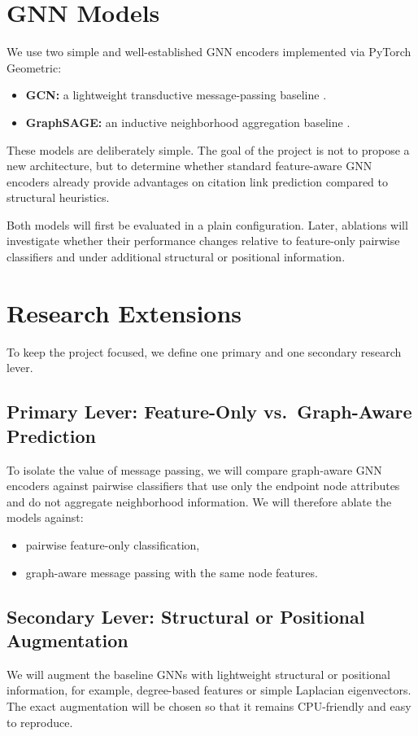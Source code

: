 \documentclass[11pt,a4paper]{article}
\begin{document}
\section{GNN Models}

We use two simple and well-established GNN encoders implemented via PyTorch Geometric:

\begin{itemize}
\item \textbf{GCN:} a lightweight transductive message-passing baseline \cite{kipf2017semi}.
\item \textbf{GraphSAGE:} an inductive neighborhood aggregation baseline \cite{hamilton2017inductive}.
\end{itemize}

These models are deliberately simple.
The goal of the project is not to propose a new architecture,
but to determine whether standard feature-aware GNN encoders already provide advantages on citation link prediction compared to structural heuristics.

Both models will first be evaluated in a plain configuration.
Later, ablations will investigate whether their performance changes relative to feature-only pairwise classifiers
and under additional structural or positional information.

\section{Research Extensions}

To keep the project focused, we define one primary and one secondary research lever.

\subsection{Primary Lever: Feature-Only vs.\ Graph-Aware Prediction}
To isolate the value of message passing, we will compare graph-aware GNN encoders against pairwise classifiers that use only the endpoint node attributes and do not aggregate neighborhood information.
We will therefore ablate the models against:
\begin{itemize}
    \item pairwise feature-only classification,
    \item graph-aware message passing with the same node features.
\end{itemize}

\subsection{Secondary Lever: Structural or Positional Augmentation}
We will augment the baseline GNNs with lightweight structural or positional information,
for example, degree-based features or simple Laplacian eigenvectors.
The exact augmentation will be chosen so that it remains CPU-friendly and easy to reproduce.
\end{document}

